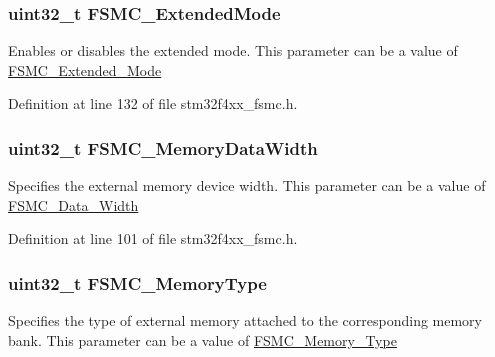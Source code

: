 \hypertarget{struct_f_s_m_c___n_o_r_s_r_a_m_init_type_def_a3726a70e62c3e7d5172296e88d36cfe4}{
\subsubsection[{F\-S\-M\-C\-\_\-\-Extended\-Mode}]{\setlength{\rightskip}{0pt plus 5cm}uint32\-\_\-t F\-S\-M\-C\-\_\-\-Extended\-Mode}}\label{struct_f_s_m_c___n_o_r_s_r_a_m_init_type_def_a3726a70e62c3e7d5172296e88d36cfe4}
Enables or disables the extended mode. This parameter can be a value of \hyperlink{group___f_s_m_c___extended___mode}{F\-S\-M\-C\-\_\-\-Extended\-\_\-\-Mode} 

Definition at line 132 of file stm32f4xx\-\_\-fsmc.\-h.

\hypertarget{struct_f_s_m_c___n_o_r_s_r_a_m_init_type_def_aa89fb8c812e5ef7800eef9574dcb972d}{
\subsubsection[{F\-S\-M\-C\-\_\-\-Memory\-Data\-Width}]{\setlength{\rightskip}{0pt plus 5cm}uint32\-\_\-t F\-S\-M\-C\-\_\-\-Memory\-Data\-Width}}\label{struct_f_s_m_c___n_o_r_s_r_a_m_init_type_def_aa89fb8c812e5ef7800eef9574dcb972d}
Specifies the external memory device width. This parameter can be a value of \hyperlink{group___f_s_m_c___data___width}{F\-S\-M\-C\-\_\-\-Data\-\_\-\-Width} 

Definition at line 101 of file stm32f4xx\-\_\-fsmc.\-h.

\hypertarget{struct_f_s_m_c___n_o_r_s_r_a_m_init_type_def_ab40afbbbeb92dd80001c6dfbb1f26492}{
\subsubsection[{F\-S\-M\-C\-\_\-\-Memory\-Type}]{\setlength{\rightskip}{0pt plus 5cm}uint32\-\_\-t F\-S\-M\-C\-\_\-\-Memory\-Type}}\label{struct_f_s_m_c___n_o_r_s_r_a_m_init_type_def_ab40afbbbeb92dd80001c6dfbb1f26492}
Specifies the type of external memory attached to the corresponding memory bank. This parameter can be a value of \hyperlink{group___f_s_m_c___memory___type}{F\-S\-M\-C\-\_\-\-Memory\-\_\-\-Type} 

